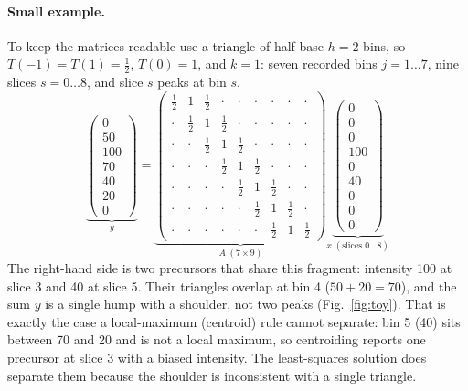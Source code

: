 \documentclass[11pt]{article}
\begin{document}
\paragraph{Small example.} To keep the matrices readable use a triangle of half-base $h=2$ bins, so $T(-1)=T(1)=\tfrac12$, $T(0)=1$, and $k=1$: seven recorded bins $j=1\ldots7$, nine slices $s=0\ldots8$, and slice $s$ peaks at bin $s$.
\[
\underbrace{\begin{pmatrix}0\\50\\100\\70\\40\\20\\0\end{pmatrix}}_{y}
=
\underbrace{\begin{pmatrix}
\tfrac12&1&\tfrac12&\cdot&\cdot&\cdot&\cdot&\cdot&\cdot\\
\cdot&\tfrac12&1&\tfrac12&\cdot&\cdot&\cdot&\cdot&\cdot\\
\cdot&\cdot&\tfrac12&1&\tfrac12&\cdot&\cdot&\cdot&\cdot\\
\cdot&\cdot&\cdot&\tfrac12&1&\tfrac12&\cdot&\cdot&\cdot\\
\cdot&\cdot&\cdot&\cdot&\tfrac12&1&\tfrac12&\cdot&\cdot\\
\cdot&\cdot&\cdot&\cdot&\cdot&\tfrac12&1&\tfrac12&\cdot\\
\cdot&\cdot&\cdot&\cdot&\cdot&\cdot&\tfrac12&1&\tfrac12
\end{pmatrix}}_{A\;(7\times9)}
\underbrace{\begin{pmatrix}0\\0\\0\\100\\0\\40\\0\\0\\0\end{pmatrix}}_{x\;(\text{slices }0\ldots8)}
\]
The right-hand side is two precursors that share this fragment: intensity 100 at slice 3 and 40 at slice 5. Their triangles overlap at bin 4 ($50+20=70$), and the sum $y$ is a single hump with a shoulder, not two peaks (Fig.~\ref{fig:toy}). That is exactly the case a local-maximum (centroid) rule cannot separate: bin 5 (40) sits between 70 and 20 and is not a local maximum, so centroiding reports one precursor at slice 3 with a biased intensity. The least-squares solution does separate them because the shoulder is inconsistent with a single triangle.
\end{document}
